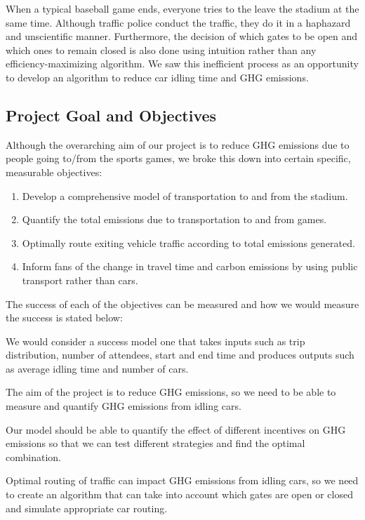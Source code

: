 When a typical baseball game ends, everyone tries to the leave the
stadium at the same time. Although traffic police conduct the traffic,
they do it in a haphazard and unscientific manner. Furthermore, the
decision of which gates to be open and which ones to remain closed is
also done using intuition rather than any efficiency-maximizing
algorithm. We saw this inefficient process as an opportunity to
develop an algorithm to reduce car idling time and GHG emissions.

\subsection{Project Goal and Objectives}
Although the overarching aim of our project is to reduce GHG emissions
due to people going to/from the sports games, we broke this down into
certain specific, measurable objectives:

\begin{enumerate}
    \item Develop a comprehensive model of transportation to and from
  the stadium.
    \item Quantify the total emissions due to transportation to and
  from games.
    \item Optimally route exiting vehicle traffic according to total
  emissions generated.
    \item Inform fans of the change in travel time and carbon
  emissions by using public transport rather than cars.
\end{enumerate}

The success of each of the objectives can be measured and how we would
measure the success is stated below:

We would consider a success model one that takes inputs such as trip
distribution, number of attendees, start and end time and produces
outputs such as average idling time and number of cars.

The aim of the project is to reduce GHG emissions, so we need to be
able to measure and quantify GHG emissions from idling cars.

Our model should be able to quantify the effect of different
incentives on GHG emissions so that we can test different strategies
and find the optimal combination.

Optimal routing of traffic can impact GHG emissions from idling cars,
so we need to create an algorithm that can take into account which
gates are open or closed and simulate appropriate car routing.

